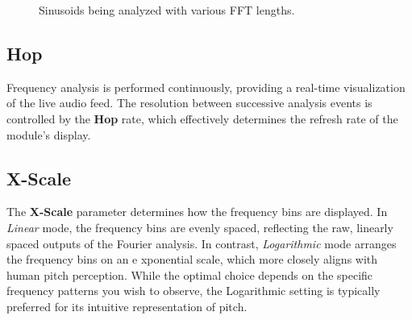 \documentclass[12pt,letter]{article}
\begin{document}
\clearpage

\begin{figure}[!htp]
\centering
{}
\hfill
{}
\hfill
{}
\caption{Sinusoids being analyzed with various FFT lengths.}
\label{fig:length-n}
\end{figure}


\subsection{Hop}

Frequency analysis is performed continuously, providing a real-time
visualization of the live audio feed. The resolution between successive
analysis events is controlled by the \textbf{Hop} rate, which effectively
determines the refresh rate of the module's display.

\subsection{X-Scale}

The \textbf{X-Scale} parameter determines how the frequency bins are
displayed. In \textit{Linear} mode, the frequency bins are evenly spaced,
reflecting the raw, linearly spaced outputs of the Fourier analysis. In
contrast, \textit{Logarithmic} mode arranges the frequency bins on an e
xponential scale, which more closely aligns with human pitch perception.
While the optimal choice depends on the specific frequency patterns you wish
to observe, the Logarithmic setting is typically preferred for its intuitive
representation of pitch.
\end{document}
